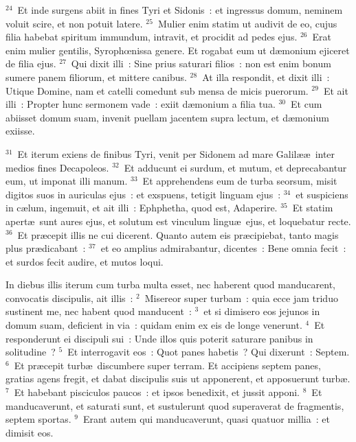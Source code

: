 ${}^{24}$~Et inde surgens abiit in fines Tyri et Sidonis~: et ingressus domum, neminem voluit scire, et non potuit latere.
${}^{25}$~Mulier enim statim ut audivit de eo, cujus filia habebat spiritum immundum, intravit, et procidit ad pedes ejus.
${}^{26}$~Erat enim mulier gentilis, Syrophœnissa genere. Et rogabat eum ut d\ae monium ejiceret de filia ejus.
${}^{27}$~Qui dixit illi~: Sine prius saturari filios~: non est enim bonum sumere panem filiorum, et mittere canibus.
${}^{28}$~At illa respondit, et dixit illi~: Utique Domine, nam et catelli comedunt sub mensa de micis puerorum.
${}^{29}$~Et ait illi~: Propter hunc sermonem vade~: exiit d\ae monium a filia tua.
${}^{30}$~Et cum abiisset domum suam, invenit puellam jacentem supra lectum, et d\ae monium exiisse.


${}^{31}$~Et iterum exiens de finibus Tyri, venit per Sidonem ad mare Galil\ae \ae\ inter medios fines Decapoleos.
${}^{32}$~Et adducunt ei surdum, et mutum, et deprecabantur eum, ut imponat illi manum.
${}^{33}$~Et apprehendens eum de turba seorsum, misit digitos suos in auriculas ejus~: et exspuens, tetigit linguam ejus~:
${}^{34}$~et suspiciens in c\ae lum, ingemuit, et ait illi~: Ephphetha, quod est, Adaperire.
${}^{35}$~Et statim apert\ae\ sunt aures ejus, et solutum est vinculum lingu\ae\ ejus, et loquebatur recte.
${}^{36}$~Et pr\ae cepit illis ne cui dicerent. Quanto autem eis pr\ae cipiebat, tanto magis plus pr\ae dicabant~:
${}^{37}$~et eo amplius admirabantur, dicentes~: Bene omnia fecit~: et surdos fecit audire, et mutos loqui.

\lettrine[lines=3,image=true,loversize=0.05,lraise=-0.03]{I}{}n diebus illis iterum cum turba multa esset, nec haberent quod manducarent, convocatis discipulis, ait illis~:
${}^{2}$~Misereor super turbam~: quia ecce jam triduo sustinent me, nec habent quod manducent~:
${}^{3}$~et si dimisero eos jejunos in domum suam, deficient in via~: quidam enim ex eis de longe venerunt.
${}^{4}$~Et responderunt ei discipuli sui~: Unde illos quis poterit saturare panibus in solitudine~?
${}^{5}$~Et interrogavit eos~: Quot panes habetis~? Qui dixerunt~: Septem.
${}^{6}$~Et pr\ae cepit turb\ae\ discumbere super terram. Et accipiens septem panes, gratias agens fregit, et dabat discipulis suis ut apponerent, et apposuerunt turb\ae .
${}^{7}$~Et habebant pisciculos paucos~: et ipsos benedixit, et jussit apponi.
${}^{8}$~Et manducaverunt, et saturati sunt, et sustulerunt quod superaverat de fragmentis, septem sportas.
${}^{9}$~Erant autem qui manducaverunt, quasi quatuor millia~: et dimisit eos.


